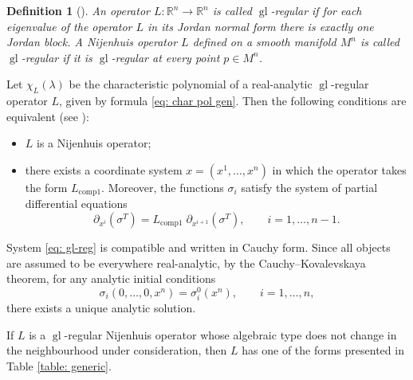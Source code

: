 \documentclass[10pt,a4paper]{amsart}
\newtheorem{Definition}{Definition}
\begin{document}
\begin{Definition}[\cite{bolsinov2024nijenhuisNGIII}]
    An operator $L:\mathbb{R}^n \to \mathbb{R}^n$ is called \textit{$\operatorname{gl}$-regular} if for each eigenvalue of the operator $L$ in its Jordan normal form there is exactly one Jordan block. A Nijenhuis operator $L$ defined on a smooth manifold $M^n$ is called \textit{$\operatorname{gl}$-regular} if it is $\operatorname{gl}$-regular at every point $p \in M^n$.
\end{Definition}

Let $\chi_L(\lambda)$ be the characteristic polynomial of a real-analytic $\operatorname{gl}$-regular operator $L$, given by formula \eqref{eq: char pol gen}. Then the following conditions are equivalent (see \cite{bolsinov2024nijenhuisNGIII}):
\begin{itemize}
    \item $L$ is a Nijenhuis operator;
    \item there exists a coordinate system $x=(x^1,\ldots,x^n)$ in which the operator takes the form $L_{\operatorname{comp1}}$.
    Moreover, the functions $\sigma_i$ satisfy the system of partial differential equations
    \begin{equation}\label{eq: gl-reg}
        \partial_{x^i}
       \left(\sigma^T \right)
        = L_{\operatorname{comp1}} \;
        \partial_{x^{i+1}}
       \left(\sigma^T \right),
        \qquad i=1,\ldots,n-1.
    \end{equation}
\end{itemize}

System \eqref{eq: gl-reg} is compatible and written in Cauchy form. Since all objects are assumed to be everywhere real-analytic, by the Cauchy–Kovalevskaya theorem, for any analytic initial conditions
\[
\sigma_i(0,\ldots,0,x^n)=\sigma_i^0(x^n),\qquad i=1,\ldots,n,
\]
there exists a unique analytic solution.

If $L$ is a $\operatorname{gl}$-regular Nijenhuis operator whose algebraic type does not change in the neighbourhood under consideration, then $L$ has one of the forms presented in Table \ref{table: generic}.
\end{document}
